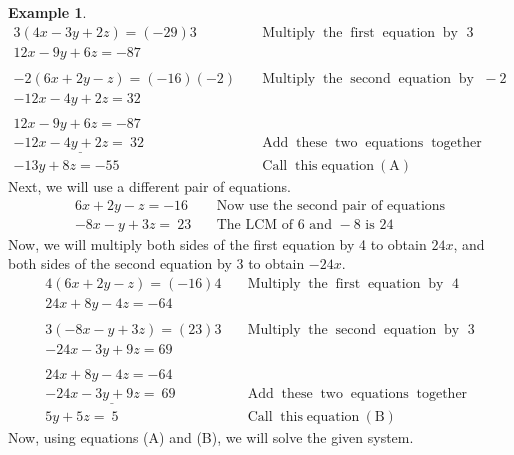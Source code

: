 \documentclass[12pt]{book}
\theoremstyle{definition}
\newtheorem{example}{Example}
\newcommand{\tmop}[1]{\ensuremath{\operatorname{#1}}}
\begin{document}
\begin{example}
	\begin{eqnarray*}
    3 (4 x - 3 y + 2 z) = (- 29) 3 &  & \tmop{Multiply} \tmop{the}
    \tmop{first} \tmop{equation} \tmop{by~} 3\\
    12 x - 9 y + 6 z = - 87~~~~ &  & \\
    &  & \\
    - 2 (6 x + 2 y - z) = (- 16) (- 2) &  & \tmop{Multiply} \tmop{the}
    \tmop{second} \tmop{equation} \tmop{by~} - 2\\
    - 12 x - 4 y + 2 z = 32~~~~~~~~~~~ &  & \\
    &  & \\
    12 x - 9 y + 6 z = - 87 &  & \\
    \underline{- 12 x - 4 y + 2 z = ~32~} &  & \tmop{Add} \tmop{these} \tmop{two}
    \tmop{equations} \tmop{together}\\
    - 13 y + 8 z = - 55 &  & \tmop{Call} \tmop{this} \tmop{equation~(A)}
\end{eqnarray*}
Next, we will use a different pair of equations.
\begin{eqnarray*}
    6 x + 2 y - z = - 16 &  & \text{Now~use~the~second~pair~of~equations}\\
    - 8 x - y + 3 z = ~23~ &  & \text{The~LCM~of~} 6 \text{~and~} - 8
    \text{~is~} 24
\end{eqnarray*}
		Now, we will multiply both sides of the first equation by 4 to obtain $24x$, and both sides of the second equation by 3 to obtain $-24x$.
\begin{eqnarray*}
    4 (6 x + 2 y - z) = (- 16) 4 &  & \tmop{Multiply} \tmop{the} \tmop{first}
    \tmop{equation} \tmop{by~} 4\\
    24 x + 8 y - 4z = - 64~~~~ &  & \\
    &  & \\
    3 (- 8 x - y + 3 z) = (23) 3 &  & \tmop{Multiply} \tmop{the} \tmop{second}
    \tmop{equation} \tmop{by~} 3\\
    - 24 x - 3 y + 9 z = 69~~~~ &  & \\
    &  & \\
    24 x + 8 y - 4z = - 64 &  & \\
    \underline{- 24 x - 3 y + 9 z = ~69~} &  & \tmop{Add} \tmop{these} \tmop{two}
    \tmop{equations} \tmop{together}\\
    5 y + 5 z = ~5~~ &  & \tmop{Call} \tmop{this} \tmop{equation~(B)}
  \end{eqnarray*}
	Now, using equations (A) and (B), we will solve the given system.
	\begin{eqnarray*}

\end{eqnarray*}
\end{example}
\end{document}
